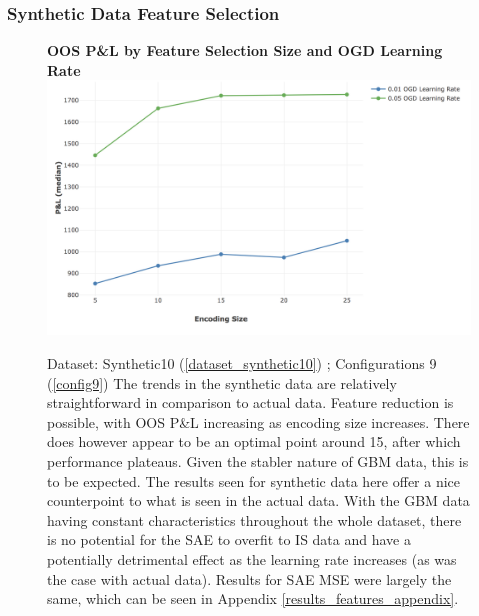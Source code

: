 \documentclass[a4paper,11pt,oneside]{article}
\theoremstyle{plain}
\theoremstyle{definition}
\begin{document}
	\subsubsection{Synthetic Data Feature Selection}\label{results_synthdata_feature_selection}
	
	\begin{figure}[H]
		\centering 
		\textbf{OOS P\&L by Feature Selection Size and OGD Learning Rate}
		\includegraphics[scale=0.3]{images/results/feature_selection/synthetic_median.png} 
		\caption[OOS P\&L by Feature Selection Size and OGD Learning Rate (Synthetic Data)]{Dataset: Synthetic10 (\ref{dataset_synthetic10}) ; Configurations 9 (\ref{config9})
			\newline The trends in the synthetic data are relatively straightforward in comparison to actual data. Feature reduction is possible, with OOS P\&L increasing as encoding size increases. There does however appear to be an optimal point around 15, after which performance plateaus. Given the stabler nature of GBM data, this is to be expected. The results seen for synthetic data here offer a nice counterpoint to what is seen in the actual data. With the GBM data having constant characteristics throughout the whole dataset, there is no potential for the SAE to overfit to IS data and have a potentially detrimental effect as the learning rate increases (as was the case with actual data).
			\newline Results for SAE MSE were largely the same, which can be seen in Appendix \ref{results_features_appendix}.
		}
		\label{figure-synthetic_median}
	\end{figure}
	
	\newpage
	
	
	
	
	
\end{document}
